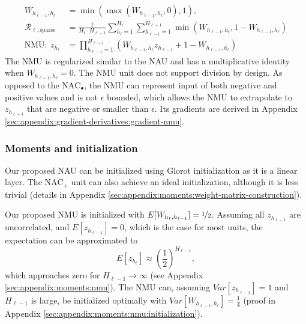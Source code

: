 \begin{align}
W_{h_{\ell-1},h_\ell} &= \min(\max(W_{h_{\ell-1},h_\ell}, 0), 1), \\
\mathcal{R}_{\ell,\mathrm{sparse}} &= \frac{1}{H_\ell \cdot H_{\ell-1}} \sum_{h_\ell=1}^{H_\ell} \sum_{h_{\ell-1}=1}^{H_{\ell-1}} \min\left(W_{h_{\ell-1},h_\ell}, 1 - W_{h_{\ell-1},h_\ell}\right) \\
\textrm{NMU}:\ z_{h_\ell} &= \prod_{h_{\ell-1}=1}^{H_{\ell-1}} \left(W_{h_{\ell-1},h_\ell} z_{h_{\ell-1}} + 1 - W_{h_{\ell-1},h_\ell} \right) \label{eq:nmu-defintion}
\end{align}
The NMU is regularized similar to the NAU and has a multiplicative identity when $W_{h_{\ell-1},h_\ell}=0$.
The NMU unit does not support division by design.
As opposed to the $\mathrm{NAC}_{\bullet}$, the NMU can represent input of both negative and positive values and is not $\epsilon$ bounded, which allows the NMU to extrapolate to $z_{h_{\ell-1}}$ that are negative or smaller than $\epsilon$. Its gradients are derived in Appendix \ref{sec:appendix:gradient-derivatives:gradient-nmu}.

\subsubsection{Moments and initialization}
Our proposed NAU can be initialized using Glorot initialization as it is a linear layer. The $\mathrm{NAC}_{+}$ unit can also achieve an ideal initialization, although it is less trivial (details in Appendix \ref{sec:appendix:moments:weight-matrix-construction}).

Our proposed NMU is initialized with $E[W_{h_{\ell}, h_{\ell - 1}}] = \nicefrac{1}{2}$. Assuming all $z_{h_{\ell-1}}$ are uncorrelated, and $E[z_{h_{\ell-1}}] = 0$, which is the case for most units, the expectation can be approximated to
\begin{equation}
E[z_{h_\ell}] \approx \left(\frac{1}{2}\right)^{H_{\ell-1}},
\end{equation}
which approaches zero for $H_{\ell-1} \rightarrow \infty$ (see Appendix \ref{sec:appendix:moments:nmu}). The NMU can, assuming $Var[z_{h_{\ell-1}}] = 1$ and $H_{\ell-1}$ is large, be initialized optimally with $Var[W_{h_{\ell-1},h_\ell}] = \frac{1}{4}$ (proof in Appendix \ref{sec:appendix:moments:nmu:initialization}).

